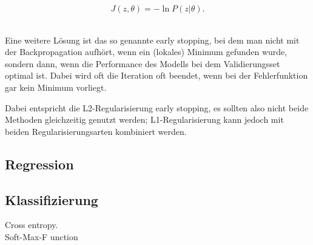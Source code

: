 \begin{equation}
	J(z, \theta) = - \ln P (z | \theta).
\end{equation}

\cite{bengio2012practical} \\
Eine weitere Lösung ist das so genannte early stopping, bei dem man nicht mit der Backpropagation aufhört, wenn ein (lokales) Minimum gefunden wurde, sondern dann, wenn die Performance des Modells bei dem Validierungsset optimal ist. Dabei wird oft die Iteration oft beendet, wenn bei der Fehlerfunktion gar kein Minimum vorliegt.  

Dabei entspricht die L2-Regularisierung early stopping, es sollten also nicht beide Methoden gleichzeitig genutzt werden; L1-Regularisierung kann jedoch mit beiden Regularisierungsarten kombiniert werden. \cite{bengio2012practical}

\subsection{Regression}

\subsection{Klassifizierung}
Cross entropy.
\\
Soft-Max-F	unction
\\



